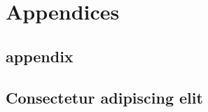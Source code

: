 \chapter{Appendices}
\section{appendix}
\begin{appendices}
  \chapter{Consectetur adipiscing elit}
\end{appendices}
